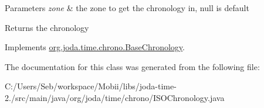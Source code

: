 \begin{DoxyParams}{Parameters}
{\em zone} & the zone to get the chronology in, null is default \\
\hline
\end{DoxyParams}
\begin{DoxyReturn}{Returns}
the chronology 
\end{DoxyReturn}


Implements \hyperlink{classorg_1_1joda_1_1time_1_1chrono_1_1_base_chronology_a63d48bcfe7b36b349c8afb8289b94b0b}{org.\-joda.\-time.\-chrono.\-Base\-Chronology}.



The documentation for this class was generated from the following file\-:\begin{DoxyCompactItemize}
\item 
C\-:/\-Users/\-Seb/workspace/\-Mobii/libs/joda-\/time-\/2./src/main/java/org/joda/time/chrono/I\-S\-O\-Chronology.\-java\end{DoxyCompactItemize}
